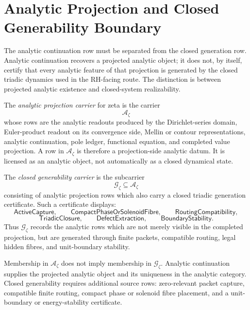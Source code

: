 \section{Analytic Projection and Closed Generability Boundary}
\label{sec:unified-reality-analytic-projection-generability-boundary}

The analytic continuation row must be separated from the closed
generation row.  Analytic continuation recovers a projected analytic
object; it does not, by itself, certify that every analytic feature of
that projection is generated by the closed triadic dynamics used in the
RH-facing route.  The distinction is between projected analytic
existence and closed-system realizability.

\begin{definition}
\label{def:unified-reality-analytic-projection-carrier}
The \emph{analytic projection carrier} for zeta is the carrier
$$
\mathcal A_{\zeta}
$$
whose rows are the analytic readouts produced by the Dirichlet-series
domain, Euler-product readout on its convergence side, Mellin or contour
representations, analytic continuation, pole ledger, functional equation,
and completed value projection.  A row in $\mathcal A_{\zeta}$ is
therefore a projection-side analytic datum.  It is licensed as an
analytic object, not automatically as a closed dynamical state.
\end{definition}

\begin{definition}
\label{def:unified-reality-closed-generability-carrier}
The \emph{closed generability carrier} is the subcarrier
$$
\mathcal G_{\zeta}\subseteq\mathcal A_{\zeta}
$$
consisting of analytic projection rows which also carry a closed
triadic generation certificate.  Such a certificate displays:
$$
\mathsf{ActiveCapture},
\qquad
\mathsf{CompactPhaseOrSolenoidFibre},
\qquad
\mathsf{RoutingCompatibility},
$$
$$
\mathsf{TriadicClosure},
\qquad
\mathsf{DefectExtraction},
\qquad
\mathsf{BoundaryStability}.
$$
Thus $\mathcal G_{\zeta}$ records the analytic rows which are not merely
visible in the completed projection, but are generated through finite
packets, compatible routing, legal hidden fibres, and unit-boundary
stability.
\end{definition}

\begin{principle}
\label{prin:unified-reality-analytic-continuation-not-generability}
Membership in $\mathcal A_{\zeta}$ does not imply membership in
$\mathcal G_{\zeta}$.  Analytic continuation supplies the projected
analytic object and its uniqueness in the analytic category.  Closed
generability requires additional source rows: zero-relevant packet
capture, compatible finite routing, compact phase or solenoid fibre
placement, and a unit-boundary or energy-stability certificate.
\end{principle}

